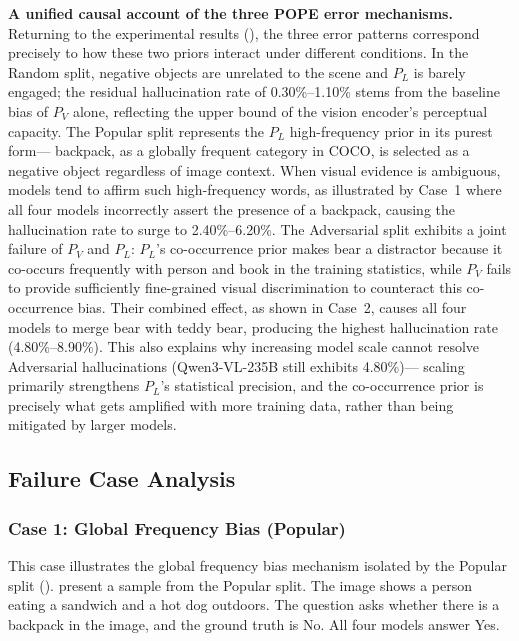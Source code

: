 \textbf{A unified causal account of the three POPE error mechanisms.}
Returning to the experimental results (),
the three error patterns correspond precisely
to how these two priors interact under different conditions.
In the Random split,
negative objects are unrelated to the scene
and $P_L$ is barely engaged;
the residual hallucination rate of 0.30\%--1.10\%
stems from the baseline bias of $P_V$ alone,
reflecting the upper bound of the vision encoder's perceptual capacity.
The Popular split represents the $P_L$ high-frequency prior in its purest form---%
backpack, as a globally frequent category in COCO,
is selected as a negative object regardless of image context.
When visual evidence is ambiguous,
models tend to affirm such high-frequency words,
as illustrated by Case~1
where all four models incorrectly assert the presence of a backpack,
causing the hallucination rate to surge to 2.40\%--6.20\%.
The Adversarial split exhibits a joint failure of $P_V$ and $P_L$:
$P_L$'s co-occurrence prior makes bear a distractor
because it co-occurs frequently with person and book in the training statistics,
while $P_V$ fails to provide sufficiently fine-grained visual discrimination
to counteract this co-occurrence bias.
Their combined effect, as shown in Case~2,
causes all four models to merge bear with teddy bear,
producing the highest hallucination rate (4.80\%--8.90\%).
This also explains why increasing model scale
cannot resolve Adversarial hallucinations
(Qwen3-VL-235B still exhibits 4.80\%)---%
scaling primarily strengthens $P_L$'s statistical precision,
and the co-occurrence prior is precisely
what gets amplified with more training data,
rather than being mitigated by larger models.
\subsection{Failure Case Analysis}

\subsubsection{Case 1: Global Frequency Bias (Popular)}
\label{sec:case1_pope}

This case illustrates
the global frequency bias mechanism
isolated by the Popular split ().
 present a sample from the Popular split.
The image shows
a person eating a sandwich and a hot dog outdoors.
The question asks whether there is a backpack in the image,
and the ground truth is No.
All four models answer Yes.

